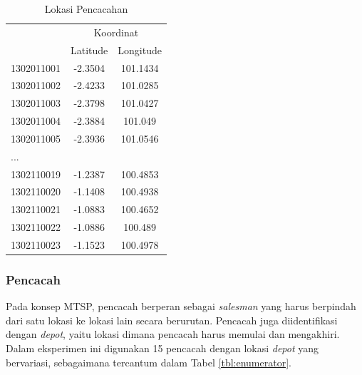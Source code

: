 \begin{table}
	\centering
	\caption{Lokasi Pencacahan}
	\label{tbl:enumeration_locations}
	\begin{tabular}{lcc}
		\toprule
			& \multicolumn{2}{c}{Koordinat}\\
		\cmidrule{2-3}
			& Latitude & Longitude\\ 
		\midrule
			1302011001 & -2.3504 & 101.1434\\ 
			1302011002 & -2.4233 & 101.0285\\ 
			1302011003 & -2.3798 & 101.0427\\ 
			1302011004 & -2.3884 & 101.049\\ 
			1302011005 & -2.3936 & 101.0546\\
			...\\
			1302110019 & -1.2387 & 100.4853\\ 
			1302110020 & -1.1408 & 100.4938\\ 
			1302110021 & -1.0883 & 100.4652\\ 
			1302110022 & -1.0886 & 100.489\\ 
			1302110023 & -1.1523 & 100.4978\\
		\bottomrule
	\end{tabular}
\end{table}


\subsubsection{Pencacah}
Pada konsep MTSP, pencacah berperan sebagai \textit{salesman} yang harus berpindah dari satu lokasi ke lokasi lain secara berurutan. Pencacah juga diidentifikasi dengan \textit{depot}, yaitu lokasi dimana pencacah harus memulai dan mengakhiri. Dalam eksperimen ini digunakan 15 pencacah dengan lokasi \textit{depot} yang bervariasi, sebagaimana tercantum dalam Tabel \ref{tbl:enumerator}.


